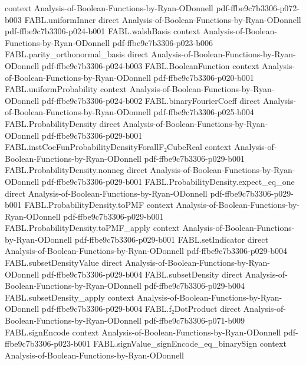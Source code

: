\begin{theorem}
  {context}
  {Analysis-of-Boolean-Functions-by-Ryan-ODonnell}
  {pdf-ffbe9c7b3306-p072-b003}
\proofstep
  {FABL.uniformInner}
  {direct}
  {Analysis-of-Boolean-Functions-by-Ryan-ODonnell}
  {pdf-ffbe9c7b3306-p024-b001}
\proofstep
  {FABL.walshBasis}
  {context}
  {Analysis-of-Boolean-Functions-by-Ryan-ODonnell}
  {pdf-ffbe9c7b3306-p023-b006}
\proofstep
  {FABL.parity_orthonormal_basis}
  {direct}
  {Analysis-of-Boolean-Functions-by-Ryan-ODonnell}
  {pdf-ffbe9c7b3306-p024-b003}
\proofstep
  {FABL.BooleanFunction}
  {context}
  {Analysis-of-Boolean-Functions-by-Ryan-ODonnell}
  {pdf-ffbe9c7b3306-p020-b001}
\proofstep
  {FABL.uniformProbability}
  {context}
  {Analysis-of-Boolean-Functions-by-Ryan-ODonnell}
  {pdf-ffbe9c7b3306-p024-b002}
\proofstep
  {FABL.binaryFourierCoeff}
  {direct}
  {Analysis-of-Boolean-Functions-by-Ryan-ODonnell}
  {pdf-ffbe9c7b3306-p025-b004}
\proofstep
  {FABL.ProbabilityDensity}
  {direct}
  {Analysis-of-Boolean-Functions-by-Ryan-ODonnell}
  {pdf-ffbe9c7b3306-p029-b001}
\proofstep
  {FABL.instCoeFunProbabilityDensityForallF₂CubeReal}
  {context}
  {Analysis-of-Boolean-Functions-by-Ryan-ODonnell}
  {pdf-ffbe9c7b3306-p029-b001}
\proofstep
  {FABL.ProbabilityDensity.nonneg}
  {direct}
  {Analysis-of-Boolean-Functions-by-Ryan-ODonnell}
  {pdf-ffbe9c7b3306-p029-b001}
\proofstep
  {FABL.ProbabilityDensity.expect_eq_one}
  {direct}
  {Analysis-of-Boolean-Functions-by-Ryan-ODonnell}
  {pdf-ffbe9c7b3306-p029-b001}
\proofstep
  {FABL.ProbabilityDensity.toPMF}
  {context}
  {Analysis-of-Boolean-Functions-by-Ryan-ODonnell}
  {pdf-ffbe9c7b3306-p029-b001}
\proofstep
  {FABL.ProbabilityDensity.toPMF_apply}
  {context}
  {Analysis-of-Boolean-Functions-by-Ryan-ODonnell}
  {pdf-ffbe9c7b3306-p029-b001}
\proofstep
  {FABL.setIndicator}
  {direct}
  {Analysis-of-Boolean-Functions-by-Ryan-ODonnell}
  {pdf-ffbe9c7b3306-p029-b004}
\proofstep
  {FABL.subsetDensityValue}
  {direct}
  {Analysis-of-Boolean-Functions-by-Ryan-ODonnell}
  {pdf-ffbe9c7b3306-p029-b004}
\proofstep
  {FABL.subsetDensity}
  {direct}
  {Analysis-of-Boolean-Functions-by-Ryan-ODonnell}
  {pdf-ffbe9c7b3306-p029-b004}
\proofstep
  {FABL.subsetDensity_apply}
  {context}
  {Analysis-of-Boolean-Functions-by-Ryan-ODonnell}
  {pdf-ffbe9c7b3306-p029-b004}
\proofstep
  {FABL.f₂DotProduct}
  {direct}
  {Analysis-of-Boolean-Functions-by-Ryan-ODonnell}
  {pdf-ffbe9c7b3306-p071-b009}
\proofstep
  {FABL.signEncode}
  {context}
  {Analysis-of-Boolean-Functions-by-Ryan-ODonnell}
  {pdf-ffbe9c7b3306-p023-b001}
\proofstep
  {FABL.signValue_signEncode_eq_binarySign}
  {context}
  {Analysis-of-Boolean-Functions-by-Ryan-ODonnell}

\end{theorem}
